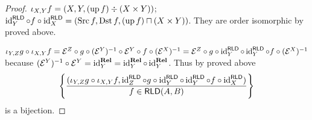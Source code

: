 \begin{proof}
  $\iota_{X, Y} f = (X , Y , (\operatorname{up} f) \div (X \times Y))$;
  $\operatorname{id}^{\mathsf{RLD}}_Y \circ f \circ
  \operatorname{id}^{\mathsf{RLD}}_X = (\operatorname{Src} f , \operatorname{Dst} f ,
  (\operatorname{up} f) \sqcap (X \times Y))$. They are order isomorphic by proved
  above.
  
  $\iota_{Y, Z} g \circ \iota_{X, Y} f =\mathcal{E}^Z \circ g \circ
  (\mathcal{E}^Y)^{- 1} \circ \mathcal{E}^Y \circ f \circ (\mathcal{E}^X)^{-
  1} =\mathcal{E}^Z \circ g \circ \operatorname{id}^{\mathsf{RLD}}_Y \circ
  \operatorname{id}^{\mathsf{RLD}}_Y \circ f \circ (\mathcal{E}^X)^{- 1}$
  because $(\mathcal{E}^Y)^{- 1} \circ \mathcal{E}^Y =
  \operatorname{id}^{\mathbf{Rel}}_Y = \operatorname{id}^{\mathbf{Rel}}_Y
  \circ \operatorname{id}^{\mathbf{Rel}}_Y$. Thus by proved above
  \[ \left\{ \frac{ (\iota_{Y, Z} g \circ \iota_{X, Y} f ,
     \operatorname{id}^{\mathsf{RLD}}_Z \circ g \circ
     \operatorname{id}^{\mathsf{RLD}}_Y \circ \operatorname{id}^{\mathsf{RLD}}_Y
     \circ f \circ \operatorname{id}^{\mathsf{RLD}}_X) }{
     f \in \mathsf{RLD} (A , B) }\right\} \]
  is a bijection.
\end{proof}

